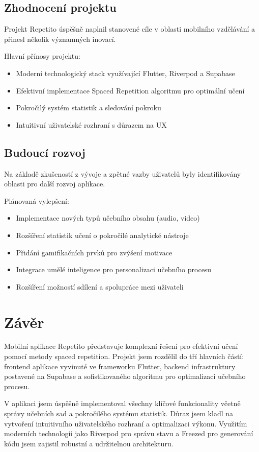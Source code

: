 \documentclass[12pt, a4paper, oneside]{report}
\begin{document}
	\section{Zhodnocení projektu}
	Projekt Repetito úspěšně naplnil stanovené cíle v oblasti mobilního vzdělávání a přinesl několik významných inovací.

	Hlavní přínosy projektu:
	\begin{itemize}
		\item Moderní technologický stack využívající Flutter, Riverpod a Supabase
		\item Efektivní implementace Spaced Repetition algoritmu pro optimální učení
		\item Pokročilý systém statistik a sledování pokroku
		\item Intuitivní uživatelské rozhraní s důrazem na UX
	\end{itemize}

	\section{Budoucí rozvoj}
	Na základě zkušeností z vývoje a zpětné vazby uživatelů byly identifikovány oblasti pro další rozvoj aplikace.

	Plánovaná vylepšení:
	\begin{itemize}
		\item Implementace nových typů učebního obsahu (audio, video)
		\item Rozšíření statistik učení o pokročilé analytické nástroje
		\item Přidání gamifikačních prvků pro zvýšení motivace
		\item Integrace umělé inteligence pro personalizaci učebního procesu
		\item Rozšíření možností sdílení a spolupráce mezi uživateli
	\end{itemize}

\chapter{Závěr}
	Mobilní aplikace Repetito představuje komplexní řešení pro efektivní učení pomocí metody spaced repetition. Projekt jsem rozdělil do tří hlavních částí: frontend aplikace vyvinuté ve frameworku Flutter, backend infrastruktury postavené na Supabase a sofistikovaného algoritmu pro optimalizaci učebního procesu.

	V aplikaci jsem úspěšně implementoval všechny klíčové funkcionality včetně správy učebních sad a pokročilého systému statistik. Důraz jsem kladl na vytvoření intuitivního uživatelského rozhraní a optimalizaci výkonu. Využitím moderních technologií jako Riverpod pro správu stavu a Freezed pro generování kódu jsem zajistil robustní a udržitelnou architekturu.
\end{document}
